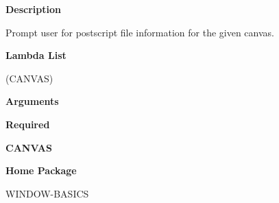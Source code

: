  
{\bf Description}

Prompt user for postscript file information for the given canvas.

 
{\bf Lambda List}

(CANVAS)

 
{\bf Arguments}


\beginhang
{\bf Required}\hspace{2em}
 
{\bf CANVAS}


 
\endhang
 
{\bf Home Package}

WINDOW-BASICS

